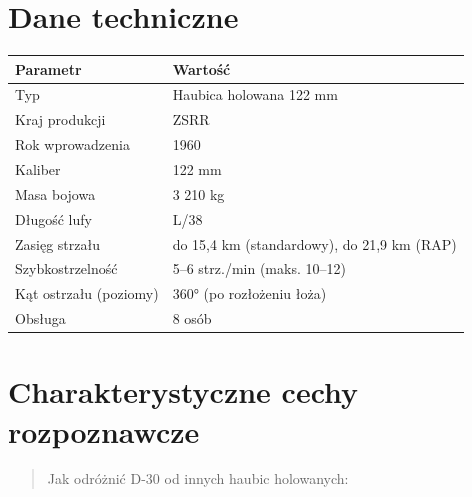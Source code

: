 \documentclass[12pt,openany,oneside]{book}
\begin{document}
\section{Dane techniczne}\label{dane-techniczne-16}

\begin{longtable}[]{@{}ll@{}}
\toprule\noalign{}
Parametr & Wartość \\
\midrule\noalign{}
\endhead
\bottomrule\noalign{}
\endlastfoot
Typ & Haubica holowana 122 mm \\
Kraj produkcji & ZSRR \\
Rok wprowadzenia & 1960 \\
Kaliber & 122 mm \\
Masa bojowa & 3 210 kg \\
Długość lufy & L/38 \\
Zasięg strzału & do 15,4 km (standardowy), do 21,9 km (RAP) \\
Szybkostrzelność & 5--6 strz./min (maks. 10--12) \\
Kąt ostrzału (poziomy) & 360° (po rozłożeniu łoża) \\
Obsługa & 8 osób \\
\end{longtable}

\section{Charakterystyczne cechy
rozpoznawcze}\label{charakterystyczne-cechy-rozpoznawcze-16}

\begin{quote}
Jak odróżnić D-30 od innych haubic holowanych:
\end{quote}
\end{document}
